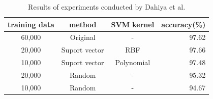 \begin{table}[b]
\begin{center}
\begin{threeparttable}
\caption{Results of experiments conducted by Dahiya et al.}
\begin{tabular}{|c|c|c|r|} \hline
training data & method & SVM kernel& accuracy(\%) \\ \hline\hline
60,000 & Original & - & 97.62 \\ \hline
20,000 & Suport vector & RBF & 97.66 \\ \hline
10,000 & Suport vector & Polynomial & 97.48 \\ \hline
20,000 & Random & - & 95.32 \\ \hline
10,000 & Random & - & 94.67 \\ \hline
\end{tabular}
\end{threeparttable}
\end{center}
\end{table}

